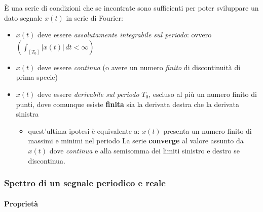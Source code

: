 \documentclass[
  paper=a4,
  ,captions=tableheading
]{scrartcl}
\providecommand{\tightlist}{%
  \setlength{\itemsep}{0pt}\setlength{\parskip}{0pt}}
\begin{document}
\begin{enumerate}
  È una serie di condizioni che se incontrate sono sufficienti per poter
  sviluppare un dato segnale \(x(t)\) in serie di Fourier:

  \begin{itemize}
  \tightlist
  \item
    \(x(t)\) deve essere \emph{assolutamente integrabile sul periodo}:
    ovvero \((\int_{[T_0]}|x(t)| \,dt < \infty)\)
  \item
    \(x(t)\) deve essere \emph{continua} (o avere un numero
    \emph{finito} di discontinuità di prima specie)
  \item
    \(x(t)\) deve essere \emph{derivabile sul periodo} \(T_0\), escluso
    al più un numero finito di punti, dove comunque esiste
    \textbf{finita} sia la derivata destra che la derivata sinistra

    \begin{itemize}
    \tightlist
    \item
      quest'ultima ipotesi è equivalente a: \(x(t)\) presenta un numero
      finito di massimi e minimi nel periodo La serie \textbf{converge}
      al valore assunto da \(x(t)\) dove \emph{continua} e alla
      semisomma dei limiti sinistro e destro se discontinua.
    \end{itemize}
  \end{itemize}
\end{enumerate}

\subsubsection{Spettro di un segnale periodico e
reale}\label{spettro-di-un-segnale-periodico-e-reale}

\paragraph{Proprietà}\label{proprietuxe0}
\end{document}
